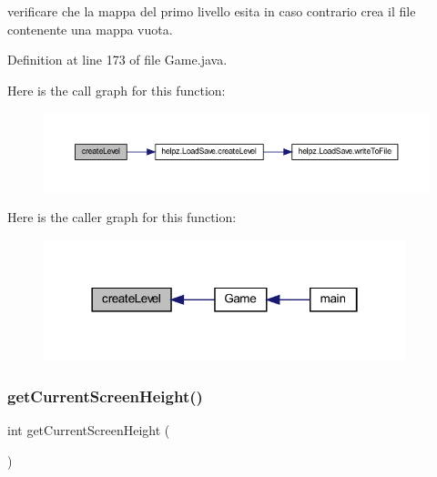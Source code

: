 verificare che la mappa del primo livello esita in caso contrario crea il file contenente una mappa vuota. 



Definition at line 173 of file Game.\+java.

Here is the call graph for this function\+:\nopagebreak
\begin{figure}[H]
\begin{center}
\leavevmode
\includegraphics[width=350pt]{classprogetto_1_1_game_ad79f312dd3a9e52f38a9e5f1536537fd_cgraph}
\end{center}
\end{figure}
Here is the caller graph for this function\+:\nopagebreak
\begin{figure}[H]
\begin{center}
\leavevmode
\includegraphics[width=298pt]{classprogetto_1_1_game_ad79f312dd3a9e52f38a9e5f1536537fd_icgraph}
\end{center}
\end{figure}
\mbox{\label{classprogetto_1_1_game_a08d0108e179608c5b692376d7af26351}} 
\subsubsection{\texorpdfstring{get\+Current\+Screen\+Height()}{getCurrentScreenHeight()}}
{\footnotesize\ttfamily int get\+Current\+Screen\+Height (\begin{DoxyParamCaption}{ }\end{DoxyParamCaption})}



